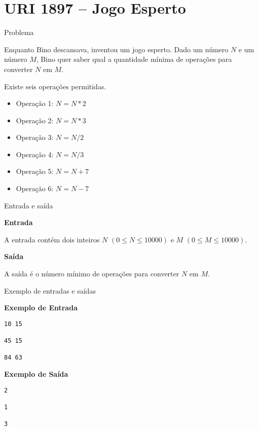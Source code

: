 \section{URI 1897 -- Jogo Esperto}

\begin{frame}[fragile]{Problema}

Enquanto Bino descansava, inventou um jogo esperto. Dado um número $N$ e um número $M$, Bino quer 
saber qual a quantidade mínima de operações para converter $N$ em $M$.

Existe seis operações permitidas.

\begin{itemize}
    \item Operação 1: $N = N*2$
    \item Operação 2: $N = N*3$
    \item Operação 3: $N = N/2$
    \item Operação 4: $N = N/3$
    \item Operação 5: $N = N+7$
    \item Operação 6: $N = N-7$
\end{itemize}

\end{frame}

\begin{frame}[fragile]{Entrada e saída}

\textbf{Entrada}

A entrada contém dois inteiros $N$ $(0\leq N\leq 10000)$ e $M$ $(0\leq M\leq 10000)$.

\textbf{Saída}

A saída é o número mínimo de operações para converter $N$ em $M$.

\end{frame}

\begin{frame}[fragile]{Exemplo de entradas e saídas}

\begin{minipage}[t]{0.5\textwidth}
\textbf{Exemplo de Entrada}
\begin{verbatim}
10 15

45 15

84 63
\end{verbatim}
\end{minipage}
\begin{minipage}[t]{0.45\textwidth}
\textbf{Exemplo de Saída}
\begin{verbatim}
2

1

3
\end{verbatim}
\end{minipage}
\end{frame}

